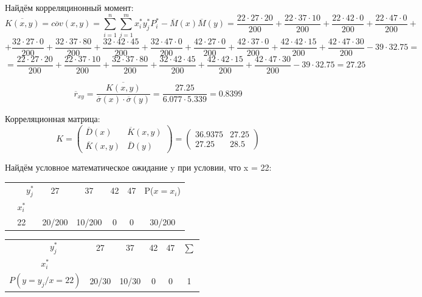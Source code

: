 \documentclass{article}
\begin{document}
Найдём корреляцинонный момент: 
\[\overline{K(x, y)} = \overline{cov}(x, y) = \sum_{i=1}^{n}\sum_{j=1}^{m}x_i^*y_j^*P_i^* - \overline{M}(x)\overline{M}(y) = \frac{22\cdot 27 \cdot 20}{200} + \frac{22\cdot 37 \cdot 10}{200} + \frac{22\cdot 42 \cdot 0}{200} + \frac{22\cdot 47 \cdot 0}{200} + \]
\[+ \frac{32\cdot 27 \cdot 0}{200} + \frac{32\cdot 37 \cdot 80}{200} + \frac{32\cdot 42 \cdot 45}{200} + \frac{32\cdot 47 \cdot 0}{200} + \frac{42\cdot 27 \cdot 0}{200} + \frac{42\cdot 37 \cdot 0}{200} + \frac{42\cdot 42 \cdot 15}{200} + \frac{42\cdot 47 \cdot 30}{200} - 39\cdot 32.75= \]
\[ = \frac{22\cdot 27 \cdot 20}{200} + \frac{22\cdot 37 \cdot 10}{200} + \frac{32\cdot 37 \cdot 80}{200} + \frac{32\cdot 42 \cdot 45}{200} + \frac{42\cdot 42 \cdot 15}{200} + \frac{42\cdot 47 \cdot 30}{200} - 39\cdot 32.75 = 27.25\]

\[\overline{r}_{xy} = \frac{\overline{K(x, y)}}{\overline{\sigma}(x)\cdot \overline{\sigma}(y)} = \frac{27.25}{6.077 \cdot 5.339} = 0.8399\]

Корреляционная матрица:
\begin{equation*}
    K =
    \begin{pmatrix}
        \overline{D}(x)& \overline{K}(x, y)\\
        \overline{K}(x, y)& \overline{D}(y)
    \end{pmatrix} = 
    \begin{pmatrix}
        36.9375& 27.25\\
        27.25& 28.5
    \end{pmatrix}
\end{equation*}

Найдём условное математическое ожидание y при условии, что x = 22:

\begin{table}[H]
    \centering
    \begin{tabular}{|c|c|c|c|c|c|}
    \hline
     \ \ \ \ $y_j^*$&  27&  37&  42& 47& P($x=x_i$)\\
    $x_i^*$&  &  &  & &\\
    \hline
    22&  20/200&  10/200&  0& 0& 30/200\\
    \hline
    \end{tabular}
\end{table}

\begin{table}[H]
    \centering
    \begin{tabular}{|c|c|c|c|c|c|}
    \hline
     \ \ \ \ $y_j^*$&  27&  37&  42& 47 & $\sum$\\
    $x_i^*$&  &  &  & &\\
    \hline
    $P(y=y_j / x = 22)$&  20/30&  10/30&  0& 0& 1\\
    \hline
    \end{tabular}
\end{table}
\end{document}
